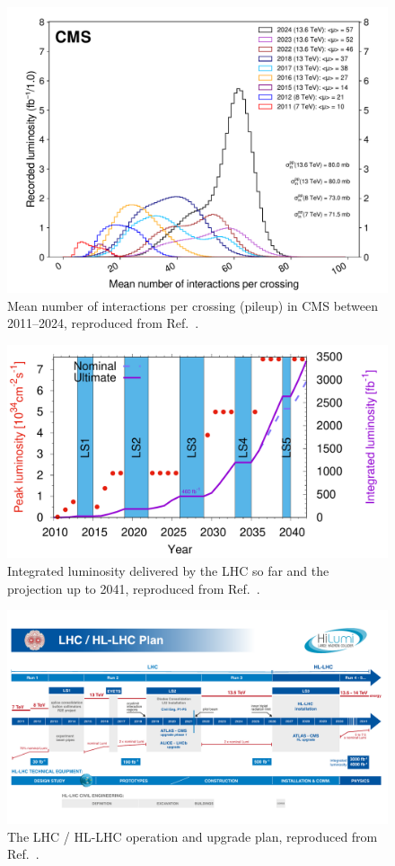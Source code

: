\begin{figure}[ht!]
    \centering
    \includegraphics[width=\textwidth]{figures/02-CMS/lhc/pileup_allYears}
    \caption{Mean number of interactions per crossing (pileup) in CMS between 2011--2024, reproduced from Ref.~\cite{cmslumi2024}.}
    \label{fig:02_lhc_pileup}
\end{figure}


\begin{figure}[ht!]
    \centering
    \includegraphics[width=\textwidth]{figures/02-CMS/lhc/luminosity.png}
    \caption{Integrated luminosity delivered by the LHC so far and the projection up to 2041, reproduced from Ref.~\cite{lhclumi}.}
    \label{fig:02_lhc_luminosity}
\end{figure}

\begin{figure}[ht!]
    \centering
    \includegraphics[width=\textwidth]{figures/02-CMS/lhc/HL-LHC_October2024.pdf}
    \caption{The LHC / HL-LHC operation and upgrade plan, reproduced from Ref.~\cite{hllhcplan}.}
    \label{fig:02_lhc_plan}
\end{figure}
